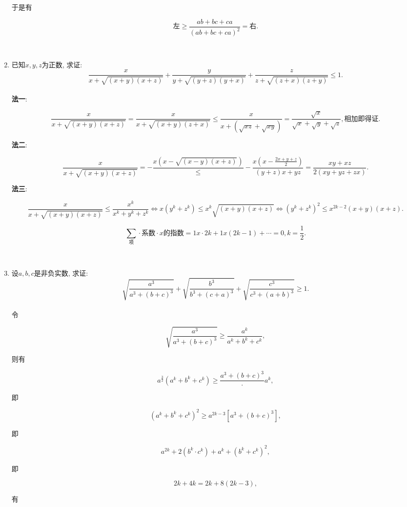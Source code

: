 \documentclass[8pt]{article}
\begin{document}
\begin{enumerate}
			于是有

			$$\text{左} \geq \frac{ab+bc+ca}{(ab+bc+ca)^2}=\text{右}.$$

		~\\

		\item 已知$x, y, z$为正数, 求证: $$\frac{x}{x+\sqrt{(x+y)(x+z)}}+\frac{y}{y+\sqrt{(y+z)(y+x)}}+\frac{z}{z+\sqrt{(z+x)(z+y)}}\leq 1.$$
			~\\

			\textbf{法一}:

			$$\frac{x}{x+\sqrt{(x+y)(x+z)}}=\frac{x}{x+\sqrt{(x+y)(z+x)}}\leq \frac{x}{x+\left(\sqrt{xz}+\sqrt{xy}\right)}=\frac{\sqrt{x}}{\sqrt{x}+\sqrt{y}+\sqrt{z}}, \text{相加即得证.}$$

			\textbf{法二}:

			$$\frac{x}{x+\sqrt{(x+y)(x+z)}}=-\frac{x(x-\sqrt{(x-y)(x+z)})}\leq -\frac{x(x-\frac{2x+y+z}{2})}{(y+z)x+yz}=\frac{xy+xz}{2(xy+yz+zx)}.$$

			\textbf{法三}:

			$$\frac{x}{x+\sqrt{(x+y)(x+z)}}\leq \frac{x^k}{x^k+y^k+z^k} \Leftrightarrow x(y^k+z^k)\leq x^k \sqrt{(x+y)(x+z)} \Leftrightarrow (y^k+z^k)^2 \leq x^{2k-2} (x+y)(x+z).$$

			$$\sum_{\text{项}}\cdot\text{系数}\cdot\text{$x$的指数}=1x\cdot 2k+1 x(2k-1)+\cdots=0, k=\frac{1}{2}.$$

		~\\

		\item 设$a, b, c$是非负实数, 求证: $$\sqrt{\frac{a^3}{a^3+(b+c)^3}}+\sqrt{\frac{b^3}{b^3+(c+a)^3}}+\sqrt{\frac{c^3}{c^3+(a+b)^3}} \geq 1.$$
			~\\

			令

			$$\sqrt{\frac{a^3}{a^3+(b+c)^3}} \geq \frac{a^k}{a^k+b^k+c^k},$$

			则有

			$$a^{\frac{3}{2}}\left(a^k+b^k+c^k\right)\geq\frac{a^3+(b+c)^3}\cdot a^k,$$

			即

			$$\left(a^k + b^k + c^k \right)^2 \geq a^{2k-3} \left[a^3 + (b+c)^3 \right],$$

			即

			$$a^{2k}+2\left(b^k \cdot c^k \right) + a^k + \left(b^k + c^k \right)^2,$$

			即

			$$2k+4k=2k+8(2k-3),$$

			有


\end{enumerate}
\end{document}
